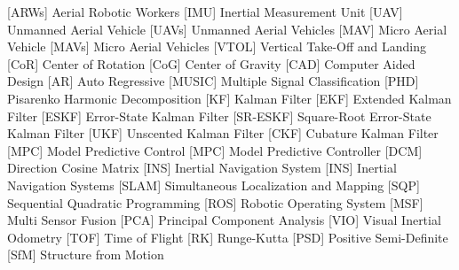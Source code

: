  [ARWs] 	        {Aerial Robotic Workers}
       [IMU]           {Inertial Measurement Unit}
       [UAV]           {Unmanned Aerial Vehicle}
 [UAVs] 	        {Unmanned Aerial Vehicles}
       [MAV]           {Micro Aerial Vehicle}
 [MAVs] 	        {Micro Aerial Vehicles}
      [VTOL]          {Vertical Take-Off and Landing}
       [CoR]           {Center of Rotation}
       [CoG]           {Center of Gravity}
       [CAD]           {Computer Aided Design}
        [AR]            {Auto Regressive}
     [MUSIC]         {Multiple Signal Classification}
       [PHD]           {Pisarenko Harmonic Decomposition}
        [KF]            {Kalman Filter}
       [EKF]           {Extended Kalman Filter}
      [ESKF]          {Error-State Kalman Filter}
   [SR-ESKF]       {Square-Root Error-State Kalman Filter}
       [UKF]           {Unscented Kalman Filter}
       [CKF]           {Cubature Kalman Filter}
       [MPC]           {Model Predictive Control}
 [MPC] 	        {Model Predictive Controller}
       [DCM]           {Direction Cosine Matrix}
       [INS]           {Inertial Navigation System}
 [INS] 	        {Inertial Navigation Systems}
      [SLAM]          {Simultaneous Localization and Mapping}
       [SQP]           {Sequential Quadratic Programming}
       [ROS]           {Robotic Operating System}
       [MSF]           {Multi Sensor Fusion}
       [PCA]           {Principal Component Analysis}
       [VIO]           {Visual Inertial Odometry}
       [TOF]           {Time of Flight}
        [RK]            {Runge-Kutta}
       [PSD]           {Positive Semi-Definite}
       [SfM]           {Structure from Motion}

